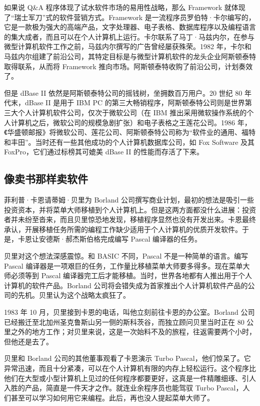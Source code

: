 \documentclass[12pt,UTF8]{ctexbook}
\begin{document}
如果说 Q\&A 程序体现了试水软件市场的易用性战略，那么 Framework 就体现了“瑞士军刀”式的软件营销方式。Framework 是一流程序员罗伯特·卡尔编写的，它是一款极为强大的高端产品，文字处理器、电子表格、数据库程序以及编程语言的集大成者，而且可以在个人计算机上运行。卡尔联系了马丁·马兹内尔，在参与微型计算机软件工作之前，马兹内尔撰写的广告曾经屡获殊荣。1982 年，卡尔和马兹内尔组建了前沿公司，其特定目标是与微型计算机软件的龙头企业阿斯顿泰特取得联系，从而将 Framework 推向市场。阿斯顿泰特收购了前沿公司，计划奏效了。

但是 dBase II 依然是阿斯顿泰特公司的摇钱树，坐拥数百万用户。20 世纪 80 年代末，dBase II 是用于 IBM PC 的第三大畅销程序，阿斯顿泰特公司则是世界第三大个人计算机软件公司，仅次于微软公司（在 IBM 推出采用微软操作系统的个人计算机之后，微软公司的规模急剧扩张）和电子表格之王莲花公司。1986 年，《华盛顿邮报》将微软公司、莲花公司、阿斯顿泰特公司称为“软件业的通用、福特和丰田”。当时还有一些其他成功的个人计算机数据库公司，如 Fox Software 及其 FoxPro，它们通过标榜其可媲美 dBase II 的性能而存活了下来。





\subsection{像卖书那样卖软件}


菲利普·卡恩请蒂姆·贝里为 Borland 公司撰写商业计划，最初的想法是吸引一些投资资本，并将菜单大师移植到个人计算机上。但是这两方面都没什么进展：投资者并未纷至沓来，而且贝里惊恐地发现，移植程序显然也没有开发出来。卡恩最终承认，开展移植任务所需的编程工作缺少适用于个人计算机的优质开发软件。于是，卡恩让安德斯·郝杰斯伯格完成编写 Pascal 编译器的任务。

贝里对这个想法深感震惊。和 BASIC 不同，Pascal 不是一种简单的语言。编写 Pascal 编译器是一项艰巨的任务，工作量比移植菜单大师要多得多。现在菜单大师必须等到 Pascal 编译器完工后才能移植。当时，世界各地都有人推出用于个人计算机的软件产品。Borland 公司将会错失成为首家推出个人计算机软件产品的公司的先机。贝里认为这个战略太疯狂了。

1983 年 10 月，贝里接到卡恩的电话，叫他立刻前往卡恩的办公室。Borland 公司已经搬迁至北加州圣克鲁斯山另一侧的斯科茨谷，而独立顾问贝里当时正在 80 公里之外的地方工作；对贝里来说，这是一次始料不及的旅程，往返需要两个小时，但他还是去了。

贝里和 Borland 公司的其他董事观看了卡恩演示 Turbo Pascal，他们惊呆了。它异常迅速，而且十分紧凑，可以在个人计算机有限的内存上轻松运行。这个程序比他们在大型或小型计算机上见过的任何程序都要更好，这真是一件精雕细琢、引人入胜的产品，简直是一件天才之作。就连业余程序员也能驾驭 Turbo Pascal，人们甚至可以学习如何用它来编程。此后，再也没人提起菜单大师了。
\end{document}
